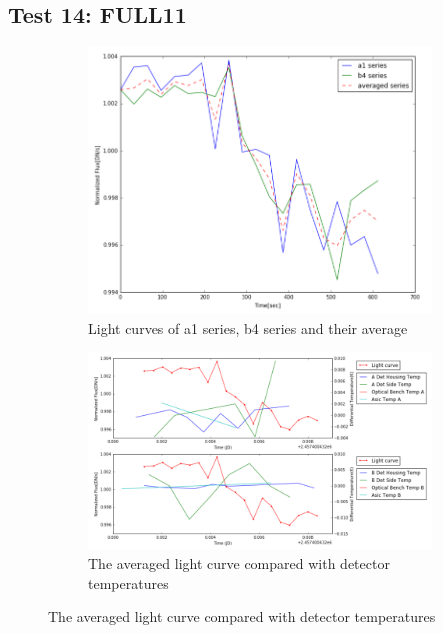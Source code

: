 \documentclass[conference]{IEEEtran}
\begin{document}
\subsection{Test 14: FULL11} 
\begin{figure}[H]
    \centering
    \begin{subfigure}{1}
        \includegraphics[scale=0.4]{ts_test14}
        \caption{Light curves of a1 series, b4 series and their average}
    \end{subfigure}

    \begin{subfigure}{2}
        \includegraphics[scale=0.4]{temp_test14}
        \caption{The averaged light curve compared with detector temperatures}
    \end{subfigure}
   

\end{figure}
\end{document}
